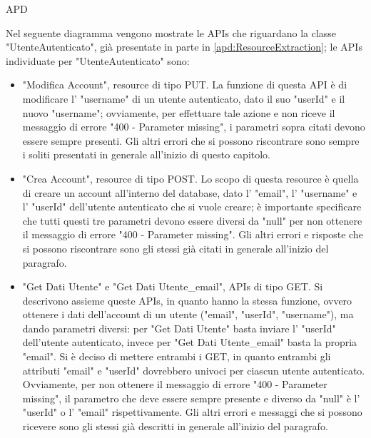\begin{listaPersonale} {APD}
\begin{listaPersonale2}[APD]{}
\begin{listaPersonale3}[APD]{}
\begin{itemize}
            \end{itemize}
            \begin{center}
                
            \end{center}
            Nel seguente diagramma vengono mostrate le APIs che riguardano la classe "UtenteAutenticato", già presentate in parte in \ref{apd:ResourceExtraction}; le APIs individuate per "UtenteAutenticato" sono:
            \begin{itemize}
                \item "Modifica Account", resource di tipo PUT. La funzione di questa API è di modificare l' "username" di un utente autenticato, dato il suo "userId" e il nuovo "username"; ovviamente, per effettuare tale azione e non riceve il messaggio di errore "400 - Parameter missing", i parametri sopra citati devono essere sempre presenti. Gli altri errori che si possono riscontrare sono sempre i soliti presentati in generale all'inizio di questo capitolo.
                \item "Crea Account", resource di tipo POST. Lo scopo di questa resource è quella di creare un account all'interno del database, dato l' "email", l' "username" e l' "userId" dell'utente autenticato che si vuole creare; è importante specificare che tutti questi tre parametri devono essere diversi da "null" per non ottenere il messaggio di errore "400 - Parameter missing". Gli altri errori e risposte che si possono riscontrare sono gli stessi già citati in generale all'inizio del paragrafo.
                \item "Get Dati Utente" e "Get Dati Utente\_email", APIs di tipo GET. Si descrivono assieme queste APIs, in quanto hanno la stessa funzione, ovvero ottenere i dati dell'account di un utente ("email", "userId", "username"), ma dando parametri diversi: per "Get Dati Utente" basta inviare l' "userId" dell'utente autenticato, invece per "Get Dati Utente\_email" basta la propria "email". Si è deciso di mettere entrambi i GET, in quanto entrambi gli attributi "email" e "userId" dovrebbero univoci per ciascun utente autenticato. Ovviamente, per non ottenere il messaggio di errore "400 - Parameter missing", il parametro che deve essere sempre presente e diverso da "null" è l' "userId" o l' "email" rispettivamente. Gli altri errori e messaggi che si possono ricevere sono gli stessi già descritti in generale all'inizio del paragrafo.

\end{itemize}
\end{listaPersonale3}
\end{listaPersonale2}
\end{listaPersonale}
